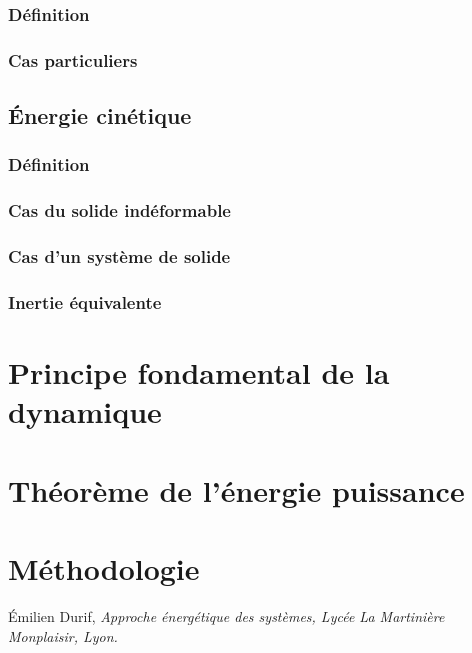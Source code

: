 \documentclass[10pt,fleqn]{article} %
\begin{document}
\subsubsection{Définition}
\subsubsection{Cas particuliers}

\subsection{Énergie cinétique}
\subsubsection{Définition}
\subsubsection{Cas du solide indéformable}
\subsubsection{Cas d'un système de solide}
\subsubsection{Inertie équivalente}

\section{Principe fondamental de la dynamique}

\section{Théorème de l'énergie puissance}

\section{Méthodologie}





\begin{thebibliography}{2}
    Émilien Durif, {\it Approche énergétique des systèmes, Lycée La Martinière Monplaisir, Lyon.}
\end{thebibliography}
\end{document}
